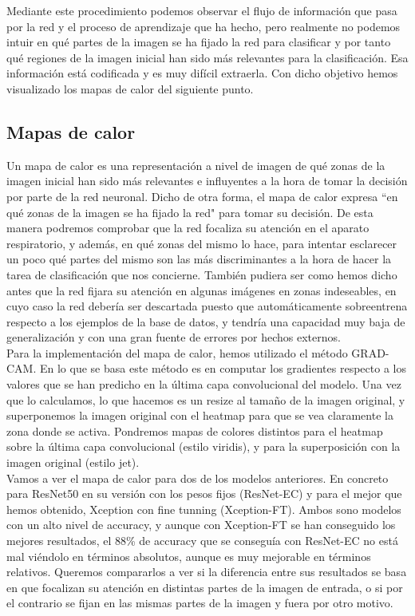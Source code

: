 \documentclass[11pt,a4paper]{article}
\theoremstyle{definition}
\begin{document}
Mediante este procedimiento podemos observar el flujo de información que pasa por la red y el proceso de aprendizaje que ha hecho, pero realmente no podemos intuir en qué partes de la imagen se ha fijado la red para clasificar y por tanto qué regiones de la imagen inicial han sido más relevantes para la clasificación. Esa información está codificada y es muy difícil extraerla. Con dicho objetivo hemos visualizado los mapas de calor del siguiente punto.

\subsection{Mapas de calor}


Un mapa de calor es una representación a nivel de imagen de qué zonas de la imagen inicial han sido más relevantes e influyentes a la hora de tomar la decisión por parte de la red neuronal. Dicho de otra forma, el mapa de calor expresa ``en qué zonas de la imagen se ha fijado la red" para tomar su decisión. De esta manera podremos comprobar que la red focaliza su atención en el aparato respiratorio, y además, en qué zonas del mismo lo hace, para intentar esclarecer un poco qué partes del mismo son las más discriminantes a la hora de hacer la tarea de clasificación que nos concierne.  También pudiera ser como hemos dicho antes que la red fijara su atención en algunas imágenes en zonas indeseables, en cuyo caso la red debería ser descartada puesto que automáticamente sobreentrena respecto a los ejemplos de la base de datos, y tendría una capacidad muy baja de generalización y con una gran fuente de errores por hechos externos.\\

Para la implementación del mapa de calor, hemos utilizado el método GRAD-CAM.  En lo que se basa este método es en computar los gradientes respecto a los valores que se han predicho en la última capa convolucional del modelo. Una vez que lo calculamos, lo que hacemos es un resize al tamaño de la imagen original, y superponemos la imagen original con el heatmap para que se vea claramente la zona donde se activa.  Pondremos mapas de colores distintos para el heatmap sobre la última capa convolucional (estilo viridis),  y para la superposición con la imagen original (estilo jet).\\

Vamos a ver el mapa de calor para dos de los modelos anteriores. En concreto para ResNet50 en su versión con los pesos fijos (ResNet-EC) y para el mejor que hemos obtenido, Xception con fine tunning (Xception-FT). Ambos sono modelos con un alto nivel de accuracy, y aunque con Xception-FT se han conseguido los mejores resultados,  el 88\% de accuracy que se conseguía con ResNet-EC no está mal viéndolo en términos absolutos, aunque es muy mejorable en términos relativos.  Queremos compararlos a ver si la diferencia entre sus resultados se basa en que focalizan su atención en distintas partes de la imagen de entrada, o si por el contrario se fijan en las mismas partes de la imagen y fuera por otro motivo. \\
\end{document}

